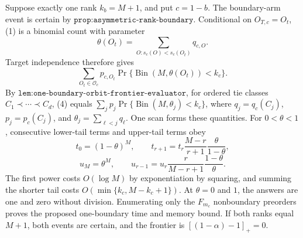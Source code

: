 Suppose exactly one rank \(k_b=M+1\), and put \(c=1-b\). The boundary-arm event is certain by \(\texttt{prop:asymmetric-rank-boundary}\). Conditional on \(O_{T,c}=O_t\), (1) is a binomial count with parameter
\[\theta(O_t)=\sum_{O:s_c(O)<s_c(O_t)}q_{c,O}.\]
Target independence therefore gives
\[\sum_{O_t\in\mathcal O_c}p_{c,O_t}\Pr\{\operatorname{Bin}(M,\theta(O_t))<k_c\}.\tag{4}\]
By \(\texttt{lem:one-boundary-orbit-frontier-evaluator}\), for ordered tie classes \(C_1\prec\cdots\prec C_d\), (4) equals \(\sum_jp_j\Pr\{\operatorname{Bin}(M,\theta_j)<k_c\}\), where \(q_j=q_c(C_j)\), \(p_j=p_c(C_j)\), and \(\theta_j=\sum_{\ell<j}q_\ell\). One scan forms these quantities. For \(0<\theta<1\), consecutive lower-tail terms and upper-tail terms obey
\[t_0=(1-\theta)^M,\qquad t_{r+1}=t_r\frac{M-r}{r+1}\frac{\theta}{1-\theta},\tag{5}\]
\[u_M=\theta^M,\qquad u_{r-1}=u_r\frac r{M-r+1}\frac{1-\theta}{\theta}.\tag{6}\]
The first power costs \(O(\log M)\) by exponentiation by squaring, and summing the shorter tail costs \(O(\min\{k_c,M-k_c+1\})\). At \(\theta=0\) and \(1\), the answers are one and zero without division. Enumerating only the \(F_{m_c}\) nonboundary preorders proves the proposed one-boundary time and memory bound. If both ranks equal \(M+1\), both events are certain, and the frontier is \([(1-\alpha)-1]_+=0\).

